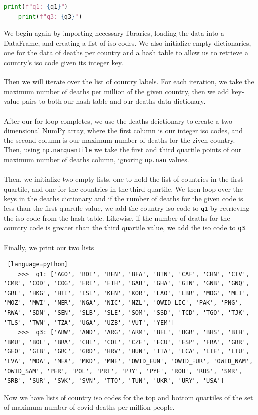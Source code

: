 \documentclass[12pt, letterpaper]{article}
\begin{document}
\begin{enumerate}
\begin{lstlisting}[language=python]
    print(f"q1: {q1}")
    print(f"q3: {q3}")
\end{lstlisting}
We begin again by importing necessary libraries, loading the data into a DataFrame, and creating a list of iso codes. 
We also initialize empty dictionaries, one for the data of deaths per country and a hash table to allow us to retrieve 
a country's iso code given its integer key. \\ \\
Then we will iterate over the list of country labels. For each iteration, we take the maximum number 
of deaths per million of the given country, then we add key-value pairs to both our hash table and our 
deaths data dictionary. \\ \\
After our for loop completes, we use the deaths deictionary to create a two dimensional NumPy array, 
where the first column is our integer iso codes, and the second column is our maximum number of deaths 
for the given country. Then, using \texttt{np.nanquantile} we take the first and third quartile points of 
our maximum number of deaths column, ignoring \texttt{np.nan} values. \\ \\
Then, we initialize two empty lists, one to hold the list of countries in the first quartile, 
and one for the countries in the third quartile. We then loop over the keys in the deaths dictionary and if the 
number of deaths for the given code is less than the first quartile value, we add the country iso code to \texttt{q1}
by retrieving the iso code from the hash table. Likewise, if the number of deaths for the country code is greater than 
the third quartile value, we add the iso code to \texttt{q3}. \\ \\
Finally, we print our two lists 
\begin{lstlisting} [language=python]
    >>>  q1: ['AGO', 'BDI', 'BEN', 'BFA', 'BTN', 'CAF', 'CHN', 'CIV', 'CMR', 'COD', 'COG', 'ERI', 'ETH', 'GAB', 'GHA', 'GIN', 'GNB', 'GNQ', 'GRL', 'HKG', 'HTI', 'ISL', 'KEN', 'KOR', 'LAO', 'LBR', 'MDG', 'MLI', 'MOZ', 'MWI', 'NER', 'NGA', 'NIC', 'NZL', 'OWID_LIC', 'PAK', 'PNG', 'RWA', 'SDN', 'SEN', 'SLB', 'SLE', 'SOM', 'SSD', 'TCD', 'TGO', 'TJK', 'TLS', 'TWN', 'TZA', 'UGA', 'UZB', 'VUT', 'YEM']
    >>>  q3: ['ABW', 'AND', 'ARG', 'ARM', 'BEL', 'BGR', 'BHS', 'BIH', 'BMU', 'BOL', 'BRA', 'CHL', 'COL', 'CZE', 'ECU', 'ESP', 'FRA', 'GBR', 'GEO', 'GIB', 'GRC', 'GRD', 'HRV', 'HUN', 'ITA', 'LCA', 'LIE', 'LTU', 'LVA', 'MDA', 'MEX', 'MKD', 'MNE', 'OWID_EUN', 'OWID_EUR', 'OWID_NAM', 'OWID_SAM', 'PER', 'POL', 'PRT', 'PRY', 'PYF', 'ROU', 'RUS', 'SMR', 'SRB', 'SUR', 'SVK', 'SVN', 'TTO', 'TUN', 'UKR', 'URY', 'USA']
\end{lstlisting}
Now we have lists of country iso codes for the top and bottom quartiles of the set of maximum number of 
covid deaths per million people. 
\end{enumerate}
\end{document}
